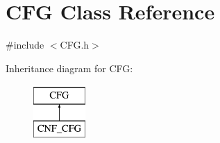 \hypertarget{classCFG}{\section{\-C\-F\-G \-Class \-Reference}
\label{d7/dd4/classCFG}
}


{\ttfamily \#include $<$\-C\-F\-G.\-h$>$}

\-Inheritance diagram for \-C\-F\-G\-:\begin{figure}[H]
\begin{center}
\leavevmode
\includegraphics[height=2.000000cm]{d7/dd4/classCFG}
\end{center}
\end{figure}
